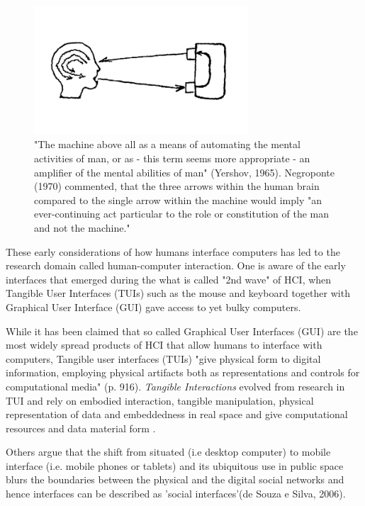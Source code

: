 
\begin{figure}[h!] 
\centering
\includegraphics[width=8cm]{Illustrations/Yershov.png}
\caption [Director-agent interaction diagram by Yershov (1965)] {"The machine above all as a means of automating the mental activities of man, or as - this term seems more appropriate - an amplifier of the mental abilities of man" (Yershov, 1965). Negroponte (1970) commented, that the three arrows within the human brain compared to the single arrow within the machine would imply "an ever-continuing act particular to the role or constitution of the man and not the machine."}
\label{Yershov}
\end{figure}

These early considerations of how humans interface computers has led to the research domain called human-computer interaction.
One is aware of the early interfaces that emerged during the what is called "2nd wave" of HCI, when Tangible User Interfaces (TUIs) such as the mouse and keyboard together with Graphical User Interface (GUI) gave access to yet bulky computers. 

While it has been claimed that so called Graphical User Interfaces (GUI) are the most widely spread products of HCI that allow humans to interface with computers,  Tangible user interfaces (TUIs) "give physical form to digital information, employing physical artifacts both as representations and controls for computational media" \cite{Ullmer_2000}(p. 916). 
\textit{Tangible Interactions} evolved from research in TUI and rely on embodied interaction, tangible manipulation, physical representation of data and embeddedness in real space and give computational resources and data material form \cite{Hornecker_2006}. 

Others argue that the shift from situated (i.e desktop computer) to mobile interface (i.e. mobile phones or tablets) and its ubiquitous use in public space blurs the boundaries between the physical and the digital social networks and hence interfaces can be described as 'social interfaces'(de Souza e Silva, 2006).  

